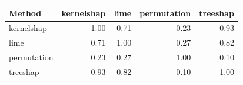 \begin{tabular}{@{}lrrrr@{}}
\toprule
Method & kernelshap & lime & permutation & treeshap \\
\midrule
kernelshap & 1.00 & 0.71 & 0.23 & 0.93 \\
lime & 0.71 & 1.00 & 0.27 & 0.82 \\
permutation & 0.23 & 0.27 & 1.00 & 0.10 \\
treeshap & 0.93 & 0.82 & 0.10 & 1.00 \\
\bottomrule
\end{tabular}
